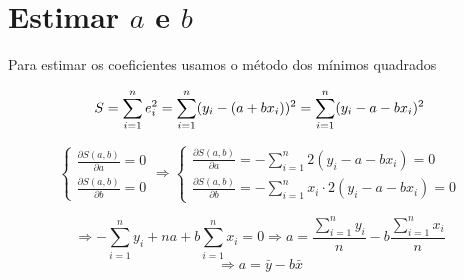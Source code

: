 \documentclass[
]{book}
\begin{document}
\section{\texorpdfstring{Estimar \(a\) e \(b\)}{Estimar a e b}}\label{estimar-a-e-b}

Para estimar os coeficientes usamos o método dos mínimos quadrados

\[
S = \sum_{i=1}^{n} e_i^2 = \sum_{i=1}^{n} (y_i - (a + bx_i))^2 = \sum_{i=1}^{n} (y_i - a - bx_i)^2\\
\]

\[
\left\{
  \begin{array}{l}
    \frac{\partial S(a, b)}{\partial a} = 0 \\
    \frac{\partial S(a, b)}{\partial b} = 0
  \end{array}
\right.
\Longrightarrow
\left\{
  \begin{array}{l}
    \frac{\partial S(a, b)}{\partial a} = - \sum_{i=1}^{n} 2(y_i - a - b x_i) = 0 \\
    \frac{\partial S(a, b)}{\partial b} = - \sum_{i=1}^{n} x_i \cdot 2(y_i - a - b x_i) = 0
  \end{array}
\right.
\]

\[
\Longrightarrow 
- \sum_{i=1}^{n} y_i + n a + b \sum_{i=1}^{n} x_i = 0
\Longrightarrow
a = \frac{\sum_{i=1}^{n} y_i}{n} - b \frac{\sum_{i=1}^{n} x_i}{n}
\]
\[
\Longrightarrow
a = \bar{y} - b\bar{x}
\]

  
\end{document}

